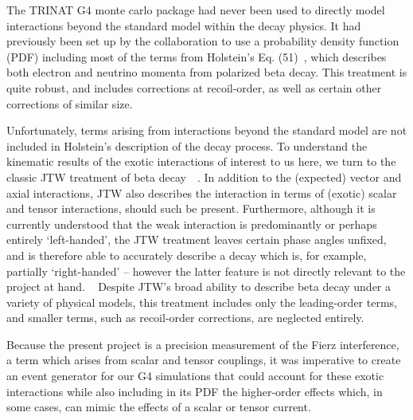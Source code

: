 The TRINAT G4 monte carlo package had never been used to directly model interactions beyond the standard model within the decay physics.  
It had  previously been set up by the collaboration to use a probability density function (PDF) including most of the terms from Holstein's Eq. (51)~\cite{holstein}, which describes both electron and neutrino momenta from polarized beta decay.  This treatment is quite robust, and includes corrections at recoil-order, as well as certain other corrections of similar size.~

Unfortunately, terms arising from interactions beyond the standard model are not included in Holstein's description of the decay process.   To understand the kinematic results of the exotic interactions of interest to us here, we turn to the classic JTW treatment of beta decay~\cite{jtw}~\cite{jtw_coulomb}.  In addition to the (expected) vector and axial interactions, JTW also describes the interaction in terms of (exotic) scalar and tensor interactions, should such be present.  Furthermore, although it is currently understood that the weak interaction is predominantly or perhaps entirely `left-handed', the JTW treatment leaves certain phase angles unfixed, and is therefore able to accurately describe a decay which is, for example, partially `right-handed' -- however the latter feature is not directly relevant to the project at hand.  ~  Despite JTW's broad ability to describe beta decay under a variety of physical models, this treatment includes only the leading-order terms, and smaller terms, such as recoil-order corrections, are neglected entirely.  

Because the present project is a precision measurement of the Fierz interference, a term which arises from scalar and tensor couplings, it was imperative to create an event generator for our G4 simulations that could account for these exotic interactions while also including in its PDF the higher-order effects which, in some cases, can mimic the effects of a scalar or tensor current.  

